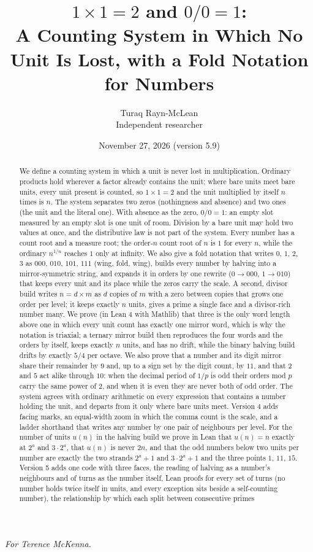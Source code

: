 \documentclass[11pt]{article}
\title{$1\times1 = 2$ and $0/0 = 1$:\\[4pt]\large A Counting System in Which No Unit Is Lost, with a Fold Notation for Numbers}
\author{Turaq Rayn-McLean\\Independent researcher}
\date{November 27, 2026 (version 5.9)}
\begin{document}
\maketitle
\begin{center}\emph{For Terence McKenna.}\end{center}

\begin{abstract}
We define a counting system in which a unit is never lost in multiplication. Ordinary products hold wherever a factor already contains the unit; where bare units meet bare units, every unit present is counted, so $1\times1 = 2$ and the unit multiplied by itself $n$ times is $n$. The system separates two zeros (nothingness and absence) and two ones (the unit and the literal one). With absence as the zero, $0/0 = 1$: an empty slot measured by an empty slot is one unit of room. Division by a bare unit may hold two values at once, and the distributive law is not part of the system. Every number has a count root and a measure root; the order-$n$ count root of $n$ is $1$ for every $n$, while the ordinary $n^{1/n}$ reaches $1$ only at infinity. We also give a fold notation that writes $0$, $1$, $2$, $3$ as $000$, $010$, $101$, $111$ (wing, fold, wing), builds every number by halving into a mirror-symmetric string, and expands it in orders by one rewrite ($0\to000$, $1\to010$) that keeps every unit and its place while the zeros carry the scale. A second, divisor build writes $n = d\times m$ as $d$ copies of $m$ with a zero between copies that grows one order per level; it keeps exactly $n$ units, gives a prime a single face and a divisor-rich number many. We prove (in Lean 4 with Mathlib) that three is the only word length above one in which every unit count has exactly one mirror word, which is why the notation is triaxial; a ternary mirror build then reproduces the four words and the orders by itself, keeps exactly $n$ units, and has no drift, while the binary halving build drifts by exactly $5/4$ per octave. We also prove that a number and its digit mirror share their remainder by $9$ and, up to a sign set by the digit count, by $11$, and that $2$ and $5$ act alike through $10$: when the decimal period of $1/p$ is odd their orders mod $p$ carry the same power of $2$, and when it is even they are never both of odd order. The system agrees with ordinary arithmetic on every expression that contains a number holding the unit, and departs from it only where bare units meet. Version 4 adds facing marks, an equal-width zoom in which the comma count is the scale, and a ladder shorthand that writes any number by one pair of neighbours per level. For the number of units $u(n)$ in the halving build we prove in Lean that $u(n) = n$ exactly at $2^a$ and $3\cdot2^a$, that $u(n)$ is never $2n$, and that the odd numbers below two units per number are exactly the two strands $2^a+1$ and $3\cdot2^a+1$ and the three points $1$, $11$, $15$. Version 5 adds one code with three faces, the reading of halving as a number's neighbours and of turns as the number itself, Lean proofs for every set of turns (no number holds twice itself in units, and every exception sits beside a self-counting number), the relationship by which each split between consecutive primes 
\end{abstract}
\end{document}
